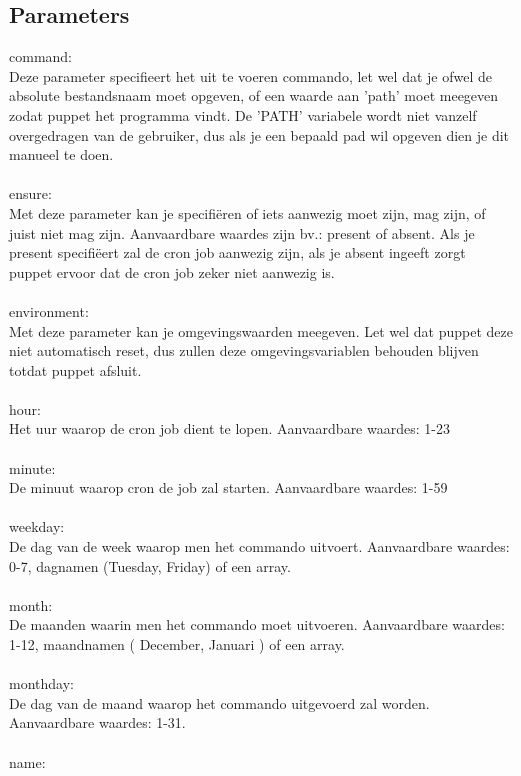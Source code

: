 \subsection{Parameters}
command:\\
Deze parameter specifieert het uit te voeren commando, let wel dat je ofwel de absolute bestandsnaam moet opgeven, of een waarde aan 'path' moet meegeven zodat puppet het programma vindt. De 'PATH' variabele wordt niet vanzelf overgedragen van de gebruiker, dus als je een bepaald pad wil opgeven dien je dit manueel te doen.\\\\
%
ensure:\\
Met deze parameter kan je specifi\"{e}ren of iets aanwezig moet zijn, mag zijn, of juist niet mag zijn. Aanvaardbare waardes zijn bv.: present of absent. Als je present specifi\"{e}ert zal de cron job aanwezig zijn, als je absent ingeeft zorgt puppet ervoor dat de cron job zeker niet aanwezig is.\\\\
%
environment:\\
Met deze parameter kan je omgevingswaarden meegeven. Let wel dat puppet deze niet automatisch reset, dus zullen deze omgevingsvariablen behouden blijven totdat puppet afsluit.\\\\
%
hour:\\
Het uur waarop de cron job dient te lopen. Aanvaardbare waardes: 1-23\\\\
%
minute:\\
De minuut waarop cron de job zal starten. Aanvaardbare waardes: 1-59\\\\
%
weekday:\\
De dag van de week waarop men het commando uitvoert. Aanvaardbare waardes: 0-7, dagnamen (Tuesday, Friday) of een array.\\\\
%
month:\\
De maanden waarin men het commando moet uitvoeren. Aanvaardbare waardes: 1-12, maandnamen ( December, Januari ) of een array.\\\\
%
monthday:\\
De dag van de maand waarop het commando uitgevoerd zal worden. Aanvaardbare waardes: 1-31.\\\\
%
name:\\
